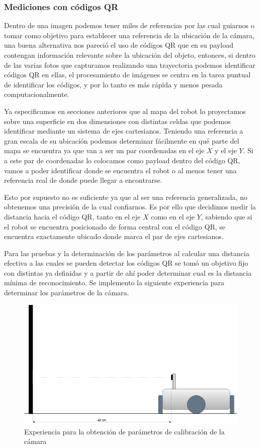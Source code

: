 \subsubsection{Mediciones con códigos QR}

Dentro de una imagen podemos tener miles de referencias por las cual guiarnos o tomar como objetivo para establecer una referencia de la ubicación de la cámara, una buena alternativa nos pareció el uso de códigos QR que en su payload contengan información relevante sobre la ubicación del objeto, entonces, si dentro de las varias fotos que capturamos realizando una trayectoria podemos identificar códigos QR en ellas, el procesamiento de imágenes se centra en la tarea puntual de identificar los códigos, y por lo tanto es más rápida y menos pesada computacionalmente.

Ya especificamos en secciones anteriores que al mapa del robot lo proyectamos sobre una superficie en dos dimensiones con distintas celdas que podemos identificar mediante un sistema de ejes cartesianos. Teniendo una referencia a gran escala de su ubicación podemos determinar fácilmente en qué parte del mapa se encuentra ya que van a ser un par coordenadas en el eje $X$ y el eje $Y$. Si a este par de coordenadas lo colocamos como payload dentro del código QR, vamos a poder identificar donde se encuentra el robot o al menos tener una referencia real de donde puede llegar a encontrarse.

Esto por supuesto no es suficiente ya que al ser una referencia generalizada, no obtenemos una precisión de la cual confiarnos. Es por ello que decidimos medir la distancia hacia el código QR, tanto en el eje $X$ como en el eje $Y$, sabiendo que si el robot se encuentra posicionado de forma central con el código QR, se encuentra exactamente ubicado donde marca el par de ejes cartesianos.

Para las pruebas y la determinación de los parámetros al calcular una distancia efectiva a las cuales se pueden detectar los códigos QR se tomó un objetivo fijo con distintas ya definidas y a partir de ahí poder determinar cual es la distancia mínima de reconocimiento. Se implemento la siguiente experiencia para determinar los parámetros de la cámara.

\begin{figure}[H]
   \includegraphics[trim={0 0 0 6cm}, clip, width=1.0\linewidth]{images/robot_medicion_qr.png}
   \caption{Experiencia para la obtención de parámetros de calibración de la cámara}
   \label{fig:robot_medicion_qr}
\end{figure}

